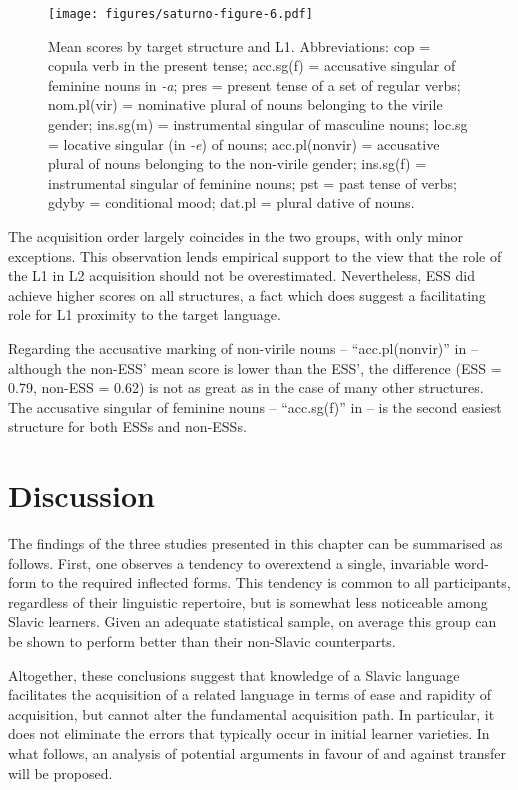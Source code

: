 \documentclass[output=paper,            colorlinks, citecolor=brown            		  ]{langscibook}
\begin{document}
  
\begin{figure}
\texttt{[image: figures/saturno-figure-6.pdf]}
\caption{Mean scores by target structure and L1. Abbreviations: cop = copula verb in the present tense; acc.sg(f) = accusative singular of feminine nouns in \textit{-a}; pres = present tense of a set of regular verbs; nom.pl(vir) = nominative plural of nouns belonging to the virile gender; ins.sg(m) = instrumental singular of masculine nouns; loc.sg = locative singular (in \textit{-e}) of nouns; acc.pl(nonvir) = accusative plural of nouns belonging to the non-virile gender; ins.sg(f) = instrumental singular of feminine nouns; pst = past tense of verbs; gdyby = conditional mood; dat.pl = plural dative of nouns.}
\label{fig:saturno:6}
\end{figure}

The acquisition order largely coincides in the two groups, with only minor exceptions. This observation lends empirical support to the view that the role of the L1 in L2 acquisition should not be overestimated. Nevertheless, ESS did achieve higher scores on all structures, a fact which does suggest a facilitating role for L1 proximity to the target language. 

Regarding the accusative marking of non-virile nouns – “acc.pl(nonvir)” in  – although the non-ESS’ mean score is lower than the ESS’, the difference (ESS = 0.79, non-ESS = 0.62) is not as great as in the case of many other structures. The accusative singular of feminine nouns – “acc.sg(f)” in  – is the second easiest structure for both ESSs and non-ESSs.

\section{Discussion}\label{sec:saturno:4}

The findings of the three studies presented in this chapter can be summarised as follows. First, one observes a tendency to overextend a single, invariable word-form to the required inflected forms. This tendency is common to all participants, regardless of their linguistic repertoire, but is somewhat less noticeable among Slavic learners. Given an adequate statistical sample, on average this group can be shown to perform better than their non-Slavic counterparts. 

Altogether, these conclusions suggest that knowledge of a Slavic language facilitates the acquisition of a related language in terms of ease and rapidity of acquisition, but cannot alter the fundamental acquisition path. In particular, it does not eliminate the errors that typically occur in initial learner varieties. In what follows, an analysis of potential arguments in favour of and against transfer will be proposed.
\end{document}
